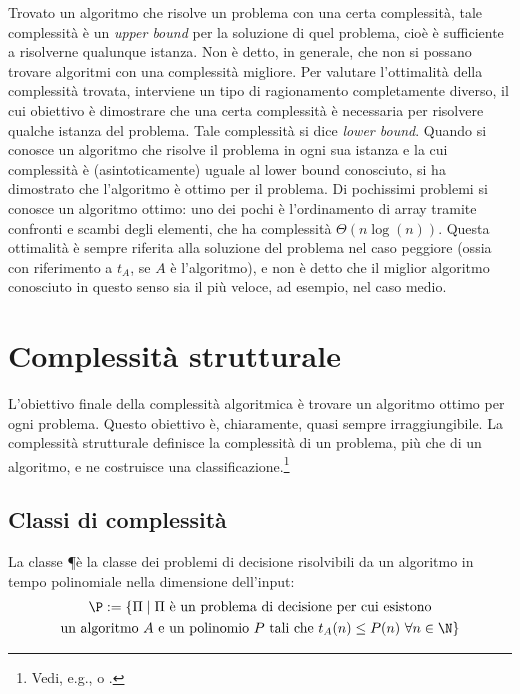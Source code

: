 Trovato un algoritmo che risolve un problema con una certa complessità, tale complessità è un \emph{upper bound} per la soluzione di quel problema, cioè è sufficiente a risolverne qualunque istanza.
Non è detto, in generale, che non si possano trovare algoritmi con una complessità migliore.
Per valutare l'ottimalità della complessità trovata, interviene un tipo di ragionamento completamente diverso, il cui obiettivo è dimostrare che una certa complessità è necessaria per risolvere qualche istanza del problema. Tale complessità si dice \emph{lower bound}.
Quando si conosce un algoritmo che risolve il problema in ogni sua istanza e la cui complessità è (asintoticamente) uguale al lower bound conosciuto, si ha dimostrato che l'algoritmo è ottimo per il problema.
Di pochissimi problemi si conosce un algoritmo ottimo: uno dei pochi è l'ordinamento di array tramite confronti e scambi degli elementi, che ha complessità $\Theta(n\log(n))$.
Questa ottimalità è sempre riferita alla soluzione del problema nel caso peggiore (ossia con riferimento a $t_A$, se $A$ è l'algoritmo), e non è detto che il miglior algoritmo conosciuto in questo senso sia il più veloce, ad esempio, nel caso medio.



\section{Complessità strutturale}
L'obiettivo finale della complessità algoritmica è trovare un algoritmo ottimo per ogni problema.
Questo obiettivo è, chiaramente, quasi sempre irraggiungibile.
La complessità strutturale definisce la complessità di un problema, più che di un algoritmo, e ne costruisce una classificazione.\footnote{Vedi, e.g., \cite{Arora:09:computcompl} o \cite{complexityzoo}.}


\subsection{Classi di complessità}
\begin{defin}[P]
	La classe \P è la classe dei problemi di decisione risolvibili da un algoritmo in tempo polinomiale nella dimensione dell'input:
	\begin{gather*}
		\P :=\{\Pi\mid \Pi\text{ è un problema di decisione per cui esistono}\\
		\text{un algoritmo $A$ e un polinomio $P$ tali che }t_A(n)\leq P(n)~\forall n\in\N\}
	\end{gather*}
\end{defin}

